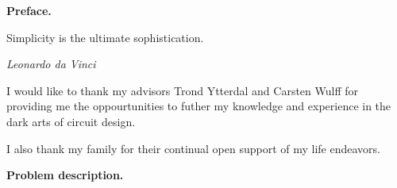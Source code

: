 	\pagebreak
	\thispagestyle{nohdr}
	\large\fontfamily{\sfdefault}\selectfont 
	\Huge\textbf{Preface.}\\
	\epigraph{Simplicity is the ultimate sophistication.}{\textit{Leonardo da Vinci}}
	\large\fontfamily{\rmdefault}\selectfont 
	\vspace{1em}
	I would like to thank my advisors Trond Ytterdal and Carsten Wulff for providing me the oppourtunities to futher my knowledge and experience in the dark arts of circuit design.

	\par I also thank my family for their continual open support of my life endeavors.




	\pagebreak
	\thispagestyle{nohdr}
	\large\fontfamily{\sfdefault}\selectfont 
	\Huge\textbf{Problem description.}\\
	\large\fontfamily{\rmdefault}\selectfont 
	
